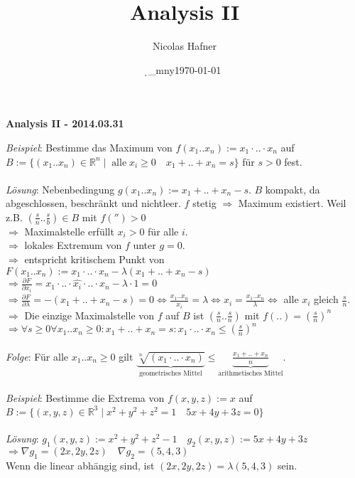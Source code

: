 \documentclass[12pt,a4paper,titlepage]{article}
\author{Nicolas Hafner}
\title{Analysis II}
\date{\d_mny\today}
\renewcommand{\d}{\partial}
\newcommand{\setR}{\mathbb{R}}
\begin{document}
	
\begin{center}{\bfseries\Huge Analysis II - 2014.03.31}\end{center}
\textit{Beispiel}: Bestimme das Maximum von $f(x_1..x_n):=x_1\cdot..\cdot x_n$ auf \\
$B:=\{(x_1..x_n)\in\setR^n\mid \;\text{alle}\; x_i\geq 0\quad x_1+..+x_n=s\}$ für $s>0$ fest. \\
\\
\textit{Lösung}: Nebenbedingung $g(x_1..x_n):=x_1+..+x_n-s$. $B$ kompakt, da abgeschlossen, beschränkt und nichtleer. $f$ stetig $\Rightarrow$ Maximum existiert. Weil z.B. $(\frac{s}{n}..\frac{s}{b})\in B$ mit $f('')>0$ \\
$\Rightarrow$ Maximalstelle erfüllt $x_i>0$ für alle $i$. \\
$\Rightarrow$ lokales Extremum von $f$ unter $g=0$. \\
$\Rightarrow$ entspricht kritischem Punkt von $F(x_1..x_n):=x_1\cdot..\cdot x_n-\lambda(x_1+..+x_n-s)$ \\
$\Rightarrow \frac{\d F}{\d x_i}=x_1\cdot..\cdot \widehat{x_i}\cdot..\cdot x_n-\lambda\cdot 1=0$ \\
$\Rightarrow \frac{\d F}{\d \lambda}=-(x_1+..+x_n-s)=0 \iff \frac{x_1..x_n}{x_i}=\lambda \iff x_i=\frac{x_1..x_n}{\lambda} \iff $ alle $x_i$ gleich $\frac{s}{n}$. \\
$\Rightarrow$ Die einzige Maximalstelle von $f$ auf $B$ ist $(\frac{s}{n}..\frac{s}{n})$ mit $f(..)=\left(\frac{s}{n}\right)^n$ \\
$\Rightarrow \forall s\geq 0\forall x_1..x_n\geq 0:x_1+..+x_n=s:x_1\cdot..\cdot x_n\leq(\frac{s}{n})^n$ \\
\\
\textit{Folge}: Für alle $x_1..x_n\geq 0$ gilt $\underbrace{\sqrt[n]{(x_1\cdot..\cdot x_n)}}_{\text{geometrisches Mittel}}\leq\underbrace{\frac{x_1+..+x_n}{n}}_{\text{arithmetisches Mittel}}$. \\
\\
\textit{Beispiel}: Bestimme die Extrema von $f(x,y,z):=x$ auf \\
$B:=\{(x,y,z)\in\setR^3\mid x^2+y^2+z^2=1\quad 5x+4y+3z=0\}$ \\
\\
\textit{Lösung}: $g_1(x,y,z):=x^2+y^2+z^2-1 \quad g_2(x,y,z):=5x+4y+3z$ \\
$\Rightarrow \nabla g_1=(2x,2y,2z) \quad \nabla g_2=(5,4,3)$ \\
Wenn die linear abhängig sind, ist $(2x,2y,2z)=\lambda(5,4,3)$ sein. \\
\end{document}

